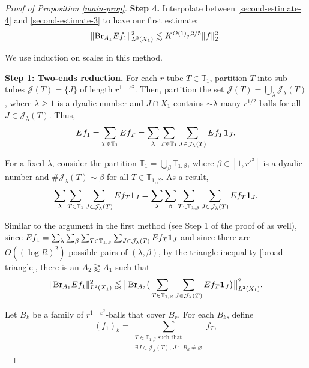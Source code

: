 \documentclass{amsart}
\numberwithin{equation}{section}
\newcommand{\be}{\beta}
\newcommand{\e}{\varepsilon}
\newcommand{\la}{\lambda}
\newcommand{\cj}{\mathcal J}
\newcommand{\ZT}{\mathbb{T}}
\newcommand{\Id}{{\bf 1}}
\newcommand{\BR}{{\rm{Br}}}
\begin{document}
\begin{proof}[Proof of Proposition \ref{main-prop}]
\medskip


{\bf Step 4.} Interpolate between \eqref{second-estimate-4} and \eqref{second-estimate-3} to have our first estimate:
\begin{equation}
\label{second-estimate}
    \|\BR_{A_1} Ef_1\|_{L^2(X_1)}^2\lesssim K^{O(1)}r^{2/5}\|f\|_2^2.
\end{equation}

\bigskip  

We use induction on scales in this method.

\medskip

{\bf Step 1: Two-ends reduction.}
For each $r$-tube $T\in\ZT_1$, partition $T$ into sub-tubes $\cj(T)=\{J\}$ of length $r^{1-\e^2}$. 
Then, partition the set $\cj(T)=\bigcup_\la\cj_\la(T)$, where $\la\geq 1$ is a dyadic number and $J\cap X_1$ contains $\sim \la$ many $r^{1/2}$-balls for all $J\in\cj_\la(T)$. 
Thus, 
\begin{equation}
    Ef_1=\sum_{T\in\ZT_1}Ef_T=\sum_{\la}\sum_{T\in\ZT_1}\sum_{J\in\cj_\la(T)}Ef_{T}\Id_J.    
\end{equation}

For a fixed $\la$, consider the partition $\ZT_1=\bigcup_\be\ZT_{1,\be}$, where $\be\in[1,r^{\e^2}]$ is a dyadic number and $\#\cj_\la(T)\sim\be$ for all $T\in\ZT_{1,\be}$. 
As a result, 
\begin{equation}
    \sum_{\la}\sum_{T\in\ZT_1}\sum_{J\in\cj_\la(T)}Ef_{T}\Id_J=\sum_{\la}\sum_\be\sum_{T\in\ZT_{1,\be}}\sum_{J\in\cj_\la(T)}Ef_{T}\Id_J.    
\end{equation}

Similar to the argument in the first method (see Step 1 of the proof of \cite[Proposition 4.13]{Demeter-Wu} as well), since $Ef_1=\sum_{\la}\sum_\be\sum_{T\in\ZT_{1,\be}}\sum_{J\in\cj_\la(T)}Ef_{T}\Id_J$ and since there are $O((\log R)^2)$ possible pairs of $(\la,\be)$, by the triangle inequality \eqref{broad-triangle}, there is an $A_2\gtrapprox A_1$ such that 
\begin{equation}
\label{reduction-2}
    \|\BR_{A_1} Ef_1\|_{L^2(X_1)}^2\lessapprox \big\|\BR_{A_2} \big(\sum_{T\in\ZT_{1,\be}}\sum_{J\in\cj_\la(T)}Ef_{T}\Id_J\big)\big\|_{L^2(X_1)}^2.
\end{equation}

\smallskip 

Let $B_k$ be a family of $r^{1-\e^2}$-balls that cover $B_r$.
For each $B_k$, define
\begin{equation}
\label{f-1-k}
    (f_1)_{k}=\sum_{\substack{T\in\ZT_{1,\be} \text{ such that}\\ \exists J\in\cj_\la(T),\, J\cap B_k\not=\varnothing}} f_{T},
\end{equation}


\end{proof}
\end{document}

